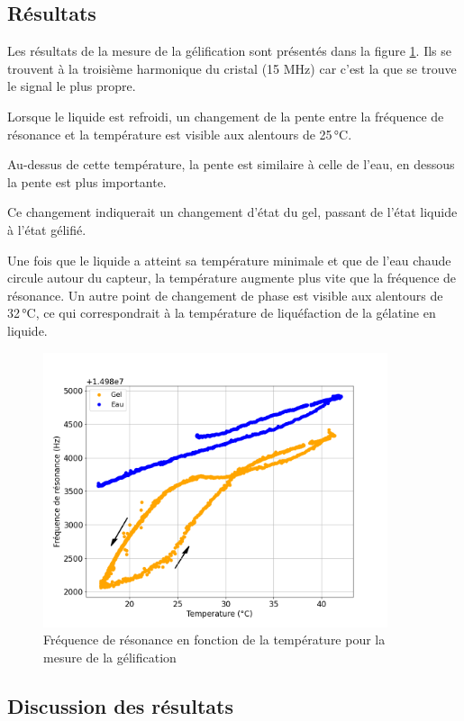 \subsection{Résultats}

Les résultats de la mesure de la gélification sont présentés dans la figure \ref{fig:Frequence gelification}. Ils se trouvent à la troisième harmonique du cristal (15 MHz) car c'est la que se trouve le signal le plus propre. 

Lorsque le liquide est refroidi, un changement de la pente entre la fréquence de résonance et la température est visible aux alentours de 25 °C. 

Au-dessus de cette température, la pente est similaire à celle de l'eau, en dessous la pente est plus importante.  

Ce changement indiquerait un changement d'état du gel, passant de l'état liquide à l'état gélifié.

Une fois que le liquide a atteint sa température minimale et que de l'eau chaude circule autour du capteur, la température augmente plus vite que la fréquence de résonance. Un autre point de changement de phase est visible aux alentours de 32 °C, ce qui correspondrait à la température de liquéfaction de la gélatine en liquide.

\begin{figure}[H]
    \centering
    \includegraphics[width=0.9\textwidth]{assets/figures/gel.png}
    \caption{Fréquence de résonance en fonction de la température pour la mesure de la gélification}
    \label{fig:Frequence gelification}
\end{figure}
\newpage
\subsection{Discussion des résultats}

